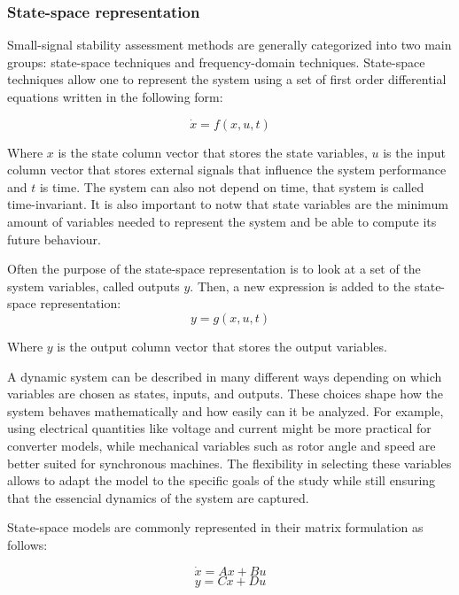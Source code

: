 \subsubsection{State-space representation}

Small-signal stability assessment methods are generally categorized into two main groups: state-space techniques
and frequency-domain techniques. State-space techniques allow one to represent the system using a set of first order
differential equations written in the following form:

\begin{equation}
    \dot{x} = f(x,u,t)
\end{equation}

Where $x$ is the state column vector that stores the state variables, $u$ is the input column vector that stores external
signals that influence the system performance and $t$ is time. The system can also not depend on time, that system is called 
time-invariant. It is also important to notw that state variables are the minimum amount of variables needed to represent the
system and be able to compute its future behaviour.

Often the purpose of the state-space representation is to look at a set of the system variables, called outputs $y$. Then, a new 
expression is added to the state-space representation:
\begin{equation}
    y = g(x,u,t)
\end{equation}

Where $y$ is the output column vector that stores the output variables.

A dynamic system can be described in many different ways depending on which variables are chosen as states, inputs, 
and outputs. These choices shape how the system behaves mathematically and how easily can it be analyzed. For example, 
using electrical quantities like voltage and current might be more practical for converter models, while mechanical variables 
such as rotor angle and speed are better suited for synchronous machines. The flexibility in selecting these variables allows
to adapt the model to the specific goals of the study while still ensuring that the essencial dynamics of the system are captured. 

State-space models are commonly represented in their matrix formulation as follows:

\begin{equation}
\dot{x} = Ax + Bu
\end{equation}
\begin{equation}
y = Cx + Du
\end{equation}

